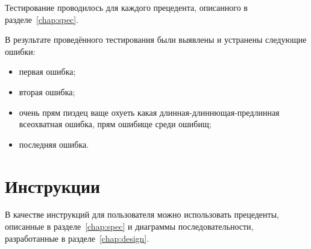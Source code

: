 Тестирование проводилось для каждого прецедента, 
описанного в разделе~\ref{chap:spec}. 

В результате проведённого тестирования были 
выявлены и устранены следующие ошибки: 
\begin{itemize}
    \item первая ошибка;
    \item вторая ошибка;
    \item очень прям пиздец ваще охуеть какая длинная-длиннющая-предлинная всеохватная ошибка, прям ошибище среди ошибищ;
    \item последняя ошибка.
\end{itemize}


\section{Инструкции}
В качестве инструкций для пользователя можно использовать 
прецеденты, описанные в разделе~\ref{chap:spec}
и диаграммы последовательности, разработанные в разделе~\ref{chap:design}.
